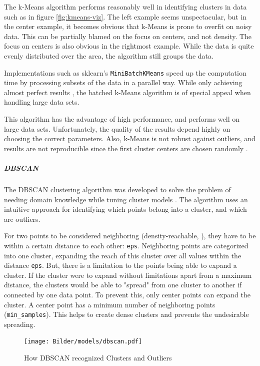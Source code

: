 		The k-Means algorithm performs reasonably well in identifying clusters in data such as in figure \ref{fig:kmeans-viz}. The left example seems unspectacular, but in the center example, it becomes obvious that k-Means is prone to overfit on noisy data. This can be partially blamed on the focus on centers, and not density. The focus on centers is also obvious in the rightmost example. While the data is quite evenly distributed over the area, the algorithm still groups the data. 
		
		Implementations such as \ac{sklearn}'s \lstinline|MiniBatchKMeans| \cite{sklearn} speed up the computation time by processing subsets of the data in a parallel way. While only achieving almost perfect results \cite{sculleyWebscaleKmeansClustering2010}, the batched k-Means algorithm is of special appeal when handling large data sets.
		
		This algorithm has the advantage of high performance, and performs well on large data sets. Unfortunately, the quality of the results depend highly on choosing the correct parameters. Also, k-Means is not robust against outliers, and results are not reproducible since the first cluster centers are chosen randomly \cite[c.6.2]{40algorithms}.
		
		\subparagraph{\acl{DBSCAN}}
		The \ac{DBSCAN} clustering algorithm was developed to solve the problem of needing domain knowledge while tuning cluster models \cite{DBSCAN}. The algorithm uses an intuitive approach for identifying which points belong into a cluster, and which are outliers.

		For two points to be considered neighboring (density-reachable, \cite{DBSCAN}), they have to be within a certain distance to each other: \lstinline|eps|. Neighboring points are categorized into one cluster, expanding the reach of this cluster over all values within the distance \lstinline|eps|.
		But, there is a limitation to the points being able to expand a cluster. If the cluster were to expand without limitations apart from a maximum distance, the clusters would be able to "spread" from one cluster to another if connected by one data point.
		To prevent this, only center points can expand the cluster. A center point has a minimum number of neighboring points (\lstinline|min_samples|). This helps to create dense clusters and prevents the undesirable spreading.
		
		 \begin{figure}[!h]
			\centering
			\texttt{[image: Bilder/models/dbscan.pdf]}
			\caption{How DBSCAN recognized Clusters and Outliers \cite{sklearn}}
			\label{fig:dbscan-viz}
		\end{figure}
	

